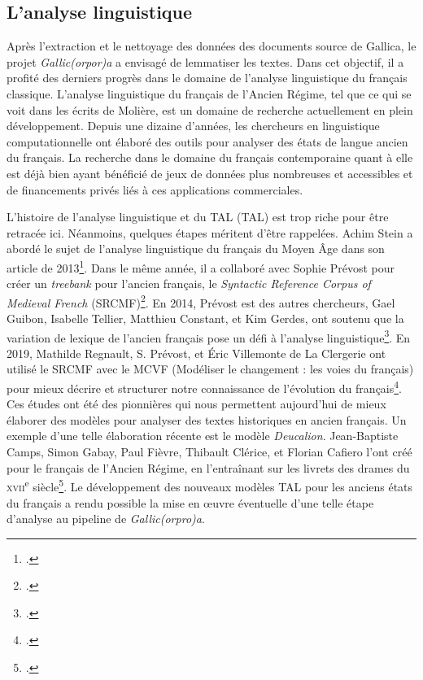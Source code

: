 \documentclass[class=article, crop=false]{standalone}
\begin{document}
\subsection{L'analyse linguistique}
Après l'extraction et le nettoyage des données des documents source de Gallica, le projet \textit{Gallic(orpor)a} a envisagé de lemmatiser les textes. Dans cet objectif, il a profité des derniers progrès dans le domaine de l'analyse linguistique du français classique. L'analyse linguistique du français de l'Ancien Régime, tel que ce qui se voit dans les écrits de Molière, est un domaine de recherche actuellement en plein développement. Depuis une dizaine d'années, les chercheurs en linguistique computationnelle ont élaboré des outils pour analyser des états de langue ancien du français. La recherche dans le domaine du français contemporaine quant à elle est déjà bien ayant bénéficié de jeux de données plus nombreuses et accessibles et de financements privés liés à ces applications commerciales.

L'histoire de l'analyse linguistique et du \acrlong{TAL} (\acrshort{TAL}) est trop riche pour être retracée ici. Néanmoins, quelques étapes méritent d'être rappelées. Achim Stein a abordé le sujet de l'analyse linguistique du français du Moyen Âge dans son article de 2013\footcite{steinSyntacticAnnotationMedieval2013}. Dans le même année, il a collaboré avec Sophie Prévost pour créer un \textit{treebank} pour l'ancien français, le \textit{Syntactic Reference Corpus of Medieval French} (SRCMF)\footcite{steinSyntacticReferenceCorpus2013}. En 2014, Prévost est des autres chercheurs, Gael Guibon, Isabelle Tellier, Matthieu Constant, et Kim Gerdes, ont soutenu que la variation de lexique de l'ancien français pose un défi à l'analyse linguistique\footcite{guibonParsingPoorlyStandardized2014}. En 2019, Mathilde Regnault, S. Prévost, et Éric Villemonte de La Clergerie ont utilisé le SRCMF avec le MCVF (Modéliser le changement : les voies du français) pour mieux décrire et structurer notre connaissance de l'évolution du français\footcite{regnaultChallengesLanguageChange2019}. Ces études ont été des pionnières qui nous permettent aujourd'hui de mieux élaborer des modèles pour analyser des textes historiques en ancien français. Un exemple d'une telle élaboration récente est le modèle \textit{Deucalion}. Jean-Baptiste Camps, Simon Gabay, Paul Fièvre, Thibault Clérice, et Florian Cafiero l'ont créé pour le français de l'Ancien Régime, en l'entraînant sur les livrets des drames du \textsc{xvii}\textsuperscript{e} siècle\footcite{campsCorpusModelsLemmatisation2021}. Le développement des nouveaux modèles TAL pour les anciens états du français a rendu possible la mise en œuvre éventuelle d'une telle étape d'analyse au pipeline de \textit{Gallic(orpro)a}.
\end{document}
